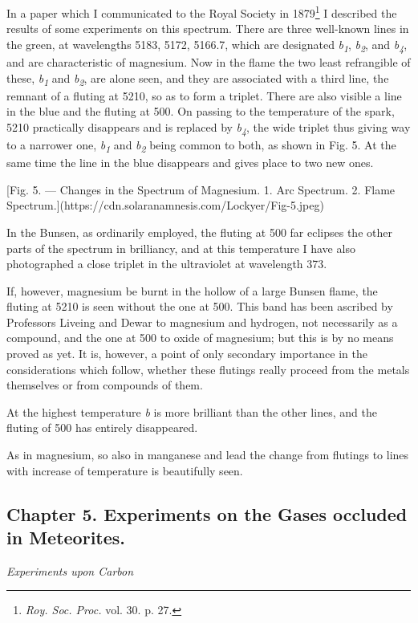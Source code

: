 \documentclass[a4paper, 12pt, oneside, polutonikogreek, english]{article}
\begin{document}
In a paper which I communicated to the Royal Society in 1879\footnote{\emph{Roy. Soc. Proc.} vol. 30. p. 27.} I described the results of some experiments on this spectrum. There are three well-known lines in the green, at wavelengths 5183, 5172, 5166.7, which are designated \emph{b\textsubscript{1}}, \emph{b\textsubscript{2}}, and \emph{b\textsubscript{4}}, and are characteristic of magnesium. Now in the flame the two least refrangible of these, \emph{b\textsubscript{1}} and \emph{b\textsubscript{2}}, are alone seen, and they are associated with a third line, the remnant of a fluting at 5210, so as to form a triplet. There are also visible a line in the blue and the fluting at 500. On passing to the temperature of the spark, 5210 practically disappears and is replaced by \emph{b\textsubscript{4}}, the wide triplet thus giving way to a narrower one, \emph{b\textsubscript{1}} and \emph{b\textsubscript{2}} being common to both, as shown in Fig. 5. At the same time the line in the blue disappears and gives place to two new ones.

[Fig. 5. --- Changes in the Spectrum of Magnesium. 1. Arc Spectrum. 2. Flame Spectrum.](https://cdn.solaranamnesis.com/Lockyer/Fig-5.jpeg)

In the Bunsen, as ordinarily employed, the fluting at 500 far eclipses the other parts of the spectrum in brilliancy, and at this temperature I have also photographed a close triplet in the ultraviolet at wavelength 373.

If, however, magnesium be burnt in the hollow of a large Bunsen flame, the fluting at 5210 is seen without the one at 500. This band has been ascribed by Professors Liveing and Dewar to magnesium and hydrogen, not necessarily as a compound, and the one at 500 to oxide of magnesium; but this is by no means proved as yet. It is, however, a point of only secondary importance in the considerations which follow, whether these flutings really proceed from the metals themselves or from compounds of them.

At the highest temperature \emph{b} is more brilliant than the other lines, and the fluting of 500 has entirely disappeared.

As in magnesium, so also in manganese and lead the change from flutings to lines with increase of temperature is beautifully seen.
\clearpage
\subsection{Chapter 5. Experiments on the Gases occluded in Meteorites.}
\begin{center}
\emph{Experiments upon Carbon}
\end{center}
\end{document}
